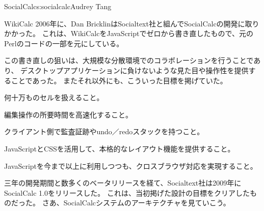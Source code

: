 \begin{aosachapter}{SocialCalc}{s:socialcalc}{Audrey Tang}
\begin{aosasect1}{WikiCalc}
2006年に、Dan BricklinはSocialtext社と組んでSocialCalcの開発に取りかかった。
これは、WikiCalcをJavaScriptでゼロから書き直したもので、元のPerlのコードの一部を元にしている。

この書き直しの狙いは、大規模な分散環境でのコラボレーションを行うことであり、
デスクトップアプリケーションに負けないような見た目や操作性を提供することであった。
またそれ以外にも、こういった目標を掲げていた。

\begin{aosaitemize}

  \item 何十万ものセルを扱えること。

  \item 編集操作の所要時間を高速化すること。

  \item クライアント側で監査証跡やundo／redoスタックを持つこと。

  \item JavaScriptとCSSを活用して、本格的なレイアウト機能を提供すること。

  \item JavaScriptを今まで以上に利用しつつも、クロスブラウザ対応を実現すること。

\end{aosaitemize}

三年の開発期間と数多くのベータリリースを経て、Socialtext社は2009年にSocialCalc 1.0をリリースした。
これは、当初掲げた設計の目標をクリアしたものだった。
さあ、SocialCalcシステムのアーキテクチャを見ていこう。


\end{aosasect1}
\end{aosachapter}
